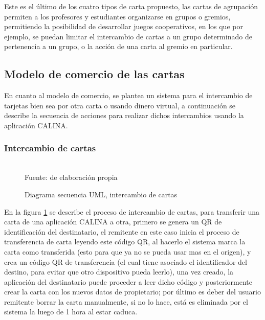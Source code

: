 Este es el último de los cuatro tipos de carta propuesto, las cartas de agrupación permiten a los profesores y
estudiantes organizarse en grupos o gremios, permitiendo la posibilidad de desarrollar juegos cooperativos, en 
los que por ejemplo, se puedan limitar el intercambio de cartas a un grupo determinado de pertenencia a un 
grupo, o la acción de una carta al gremio en particular.

\subsection{Modelo de comercio de las cartas}

En cuanto al modelo de comercio, se plantea un sistema para el intercambio de tarjetas bien sea por otra carta
o usando dinero virtual, a continuación se describe la secuencia de acciones para realizar dichos intercambios 
usando la aplicación CALINA.

\subsubsection{Intercambio de cartas}

\begin{figure}[!htb]
\caption{Diagrama secuencia UML, intercambio de cartas}
\label{img:UMLintercambio}
\centering
\begin{adjustbox}{width=12cm}
	
\end{adjustbox}
\\
{\footnotesize Fuente: de elaboración propia}
\end{figure}

En la figura \ref{img:UMLintercambio} se describe el proceso de intercambio de cartas, para transferir una 
carta de una aplicación CALINA a otra, primero se genera un QR de identificación del destinatario, el 
remitente en este caso inicia el proceso de transferencia de carta leyendo este código QR, al hacerlo el 
sistema marca la carta como transferida (esto para que ya no se pueda usar mas en el origen), y crea un código 
QR de transferencia (el cual tiene asociado el identificador del destino, para evitar que otro dispositivo 
pueda leerlo), una vez creado, la aplicación del destinatario puede proceder a leer dicho código y 
posteriormente crear la carta con los nuevos datos de propietario; por último es deber del usuario remitente 
borrar la carta manualmente, si no lo hace, está es eliminada por el sistema la luego de 1 hora al estar 
caduca.

